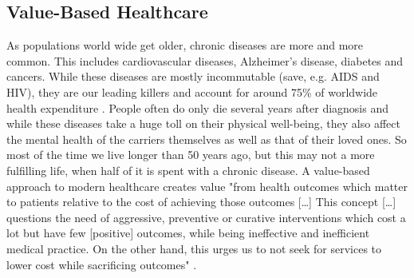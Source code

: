 \subsection{Value-Based Healthcare}
As populations world wide get older, chronic diseases are more and more common. This includes cardiovascular diseases, Alzheimer's disease, diabetes and cancers. While these diseases are mostly incommutable (save, e.g. AIDS and HIV), they are our leading killers and account for around 75\% of worldwide health expenditure \cite{tsiachristas2016financial}. People often do only die several years after diagnosis and while these diseases take a huge toll on their physical well-being, they also affect the mental health of the carriers themselves as well as that of their loved ones. So most of the time we live longer than 50 years ago, but this may not a more fulfilling life, when half of it is spent with a chronic disease. A value-based approach to modern healthcare creates value "from health outcomes which matter to patients relative to the cost of achieving those outcomes [\dots] This concept [\dots] questions the need of aggressive, preventive or curative interventions which cost a lot but have few [positive] outcomes, while being ineffective and inefficient medical practice. On the other hand, this urges us to not seek for services to lower cost while sacrificing outcomes" \cite{putera2017redefining}.
